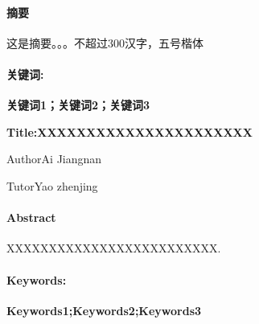 \paragraph{摘要}{\kaishu {} 这是摘要。。。不超过300汉字，五号楷体}
\vspace{2em}
\paragraph{关键词:}\textbf{ 关键词1；关键词2；关键词3}
\newpage
\thispagestyle{empty}
\begin{center}
	\textbf{\heiti {} Title:XXXXXXXXXXXXXXXXXXXXXX}
	
	\vspace{1em}
	Author\quad Ai Jiangnan
	
	Tutor\quad Yao zhenjing
\end{center}
\vspace{2em}
\paragraph{Abstract}{ XXXXXXXXXXXXXXXXXXXXXXXXX.}
\vspace{2em}
\paragraph{Keywords:}\textbf{ Keywords1;Keywords2;Keywords3}
\newpage
\begin{center}
	\tableofcontents
\end{center}
\thispagestyle{empty}